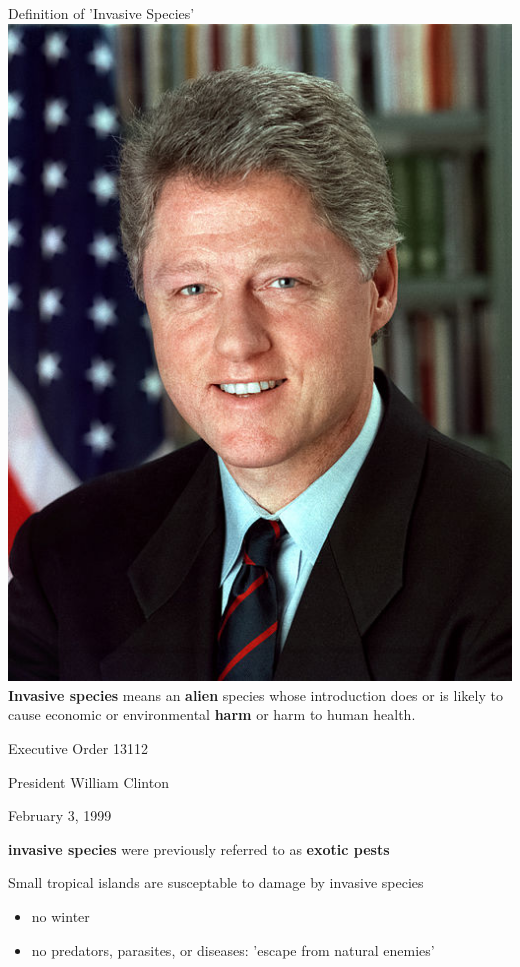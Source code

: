 \documentclass[]{beamer}
\begin{document}
\begin{frame}{Definition of 'Invasive Species'}
\includegraphics[height=0.4\textheight]{Bill_Clinton.jpg} \\

\textbf{Invasive species} means an \textbf{alien}
species whose introduction does or is
likely to cause economic or
environmental \textbf{harm} or harm to
human health.

\vspace{10px}
Executive Order 13112

President William Clinton

February 3, 1999

\vspace{10px}
\textbf{invasive species} were previously referred to as \textbf{exotic pests}
\end{frame}

\begin{frame}{Small tropical islands are susceptable to damage by invasive species}
\begin{itemize}
\item no winter
\item no predators, parasites, or diseases: 'escape from natural enemies'
\end{itemize}
\end{frame}
\end{document}
